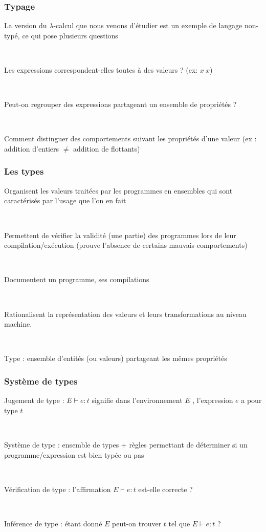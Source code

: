 \documentclass[handout,t]{beamer}
\begin{document}
\begin{frame}

\frametitle{Typage}

La version du $\lambda$-calcul
que nous venons d'étudier est un exemple de
langage non-typé, ce qui pose plusieurs questions 

~

Les expressions correspondent-elles toutes à des valeurs ? (ex:
$x\ x$)

~

Peut-on regrouper des expressions partageant un ensemble de
propriétés ?

~

Comment distinguer des comportements suivant les propriétés
d'une valeur (ex : addition d'entiers
$\not=$
addition de flottants)


\end{frame}

\begin{frame}

\frametitle{Les types}

Organisent les valeurs traitées par les programmes en
ensembles qui sont caractérisés par l'usage que l'on en fait

~

Permettent de vérifier la validité (une partie) des programmes
lors de leur compilation/exécution (prouve
l'absence de certains mauvais comportements)


~

\color{red}
Documentent un programme, ses compilations

~


Rationalisent la représentation des valeurs et leurs
transformations au niveau machine.
\color{black}

~

Type : ensemble d'entités (ou valeurs) partageant les mêmes
propriétés



\end{frame}

\begin{frame}

\frametitle{Système de types}

Jugement de type :
$E\vdash e : t $
signifie dans l'environnement
$E$ , l'expression $e$
a pour type
$t$

~

Système de type : ensemble de types + règles permettant de
déterminer si un programme/expression est bien typée ou
pas

~

Vérification de type : l'affirmation $E\vdash e : t $ est-elle correcte ?

~

Inférence de type : étant donné
$E$ peut-on trouver $t$ tel que $E\vdash e : t $ ?



\end{frame}
\end{document}
